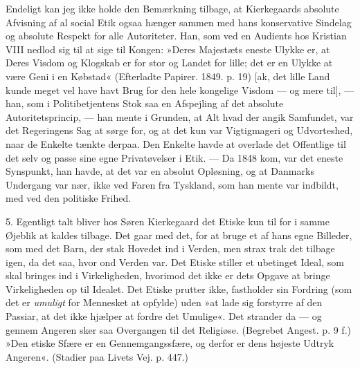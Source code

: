 \documentclass[12pt,a4paper,openany]{book}
\newcommand{\opage}[1]{\marginnote{\footnotesize\textit{[#1]}}}
\begin{document}
Endeligt kan jeg ikke holde den Bemærkning tilbage,
at Kierkegaards absolute Afvisning af al social Etik
ogsaa hænger sammen med hans konservative Sindelag
og absolute Respekt for alle Autoriteter. Han, som ved
en Audients hos Kristian VIII nedlod sig til at sige til
Kongen: »Deres Majestæts eneste Ulykke er, at Deres
Visdom og Klogskab er for stor og Landet for lille; det
er en Ulykke at være Geni i en Købstad« (Efterladte
Papirer. 1849. p. 19) [ak, det lille Land kunde meget vel
have havt Brug for den hele kongelige Visdom --- og
mere til], --- han, som i Politibetjentens Stok saa en Afspejling
af det absolute Autoritetsprincip, --- han mente
i Grunden, at Alt hvad der angik Samfundet, var det
Regeringens Sag at sørge for, og at det kun var Vigtigmageri
og Udvorteshed, naar de Enkelte tænkte derpaa.
Den Enkelte havde at overlade det Offentlige til det selv
og passe sine egne Privatøvelser i Etik. --- Da 1848 kom,
var det eneste Synspunkt, han havde, at det var en
absolut Opløsning, og at Danmarks Undergang var nær,
\opage{108}ikke ved Faren fra Tyskland, som han mente var indbildt,
med ved den politiske Frihed.

5. Egentligt talt bliver hos Søren Kierkegaard det
Etiske kun til for i samme Øjeblik at kaldes tilbage.
Det gaar med det, for at bruge et af hans egne Billeder,
som med det Barn, der stak Hovedet ind i Verden, men
strax trak det tilbage igen, da det saa, hvor ond Verden
var. Det Etiske stiller et ubetinget Ideal, som skal
bringes ind i Virkeligheden, hvorimod det ikke er dets
Opgave at bringe Virkeligheden op til Idealet. Det Etiske
prutter ikke, fastholder sin Fordring (som det er \textit{umuligt}
for Mennesket at opfylde) uden »at lade sig forstyrre af
den Passiar, at det ikke hjælper at fordre det Umulige«.
Det strander da --- og gennem Angeren sker saa Overgangen
til det Religiøse. (Begrebet Angest. p. 9 f.) »Den
etiske Sfære er en Gennemgangssfære, og derfor er dens
højeste Udtryk Angeren«. (Stadier paa Livets Vej. p. 447.)
\end{document}
